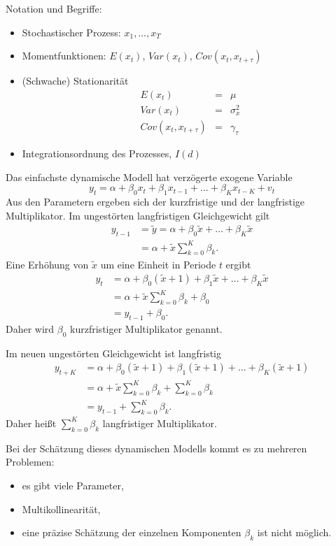 \documentclass{article}
\begin{document}
Notation und Begriffe:
\begin{itemize}
	\item Stochastischer Prozess: $x_{1},\ldots ,x_{T}$
	\item Momentfunktionen: $E(x_{t})$, $Var(x_{t})$, $Cov(x_{t},x_{t+\tau })$
	\item (Schwache) Stationarität
	\begin{eqnarray*}
		E(x_{t}) &=&\mu \\
		Var(x_{t}) &=&\sigma_x^2 \\
		Cov(x_{t},x_{t+\tau }) &=&\gamma _{\tau }
	\end{eqnarray*}
	\item Integrationsordnung des Prozesses, $I(d)$
\end{itemize}

Das einfachste dynamische Modell hat verzögerte exogene Variable
\[ y_{t}=\alpha +\beta _{0}x_{t}+\beta _{1}x_{t-1}+\ldots +\beta_{K}x_{t-K}+v_{t} \]
Aus den Parametern ergeben sich der kurzfristige und der langfristige Multiplikator.
Im ungestörten langfristigen Gleichgewicht gilt
\begin{align*}
y_{t-1} &=\tilde{y}=\alpha +\beta _{0}\tilde{x}+\ldots +\beta _{K}\tilde{x}\\
&=\alpha +\tilde{x}\sum_{k=0}^{K}\beta _{k}.
\end{align*}
Eine Erhöhung von $\tilde{x}$ um eine Einheit in Periode $t$ ergibt
\begin{align*}
y_{t} &=\alpha +\beta _{0}\left( \tilde{x}+1\right) +\beta _{1}\tilde{x}+\ldots +\beta _{K}\tilde{x} \\
&=\alpha +\tilde{x}\sum_{k=0}^{K}\beta _{k}+\beta _{0} \\
&=y_{t-1}+\beta _{0}.
\end{align*}
Daher wird $\beta _{0}$ kurzfristiger Multiplikator genannt.

Im neuen ungestörten Gleichgewicht ist langfristig
\begin{align*}
y_{t+K} &=\alpha +\beta _{0}\left( \tilde{x}+1\right) +\beta _{1}\left( 
\tilde{x}+1\right) +\ldots +\beta _{K}\left( \tilde{x}+1\right) \\
&=\alpha +\tilde{x}\sum_{k=0}^{K}\beta _{k}+\sum_{k=0}^{K}\beta _{k} \\
&=y_{t-1}+\sum_{k=0}^{K}\beta _{k}.
\end{align*}%
Daher heißt $\sum_{k=0}^{K}\beta _{k}$ langfristiger Multiplikator.

Bei der Schätzung dieses dynamischen Modells kommt es zu mehreren Problemen:
\begin{itemize}
	\item es gibt viele Parameter,
	\item Multikollinearität,
	\item eine präzise Schätzung der einzelnen Komponenten $\beta _{k}$ ist nicht möglich.
\end{itemize}
\end{document}
